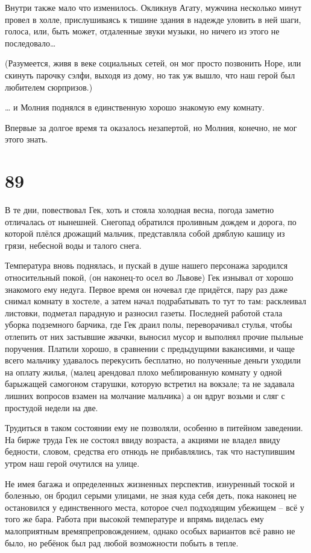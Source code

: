 \documentclass[
  a5paperpaper,
  DIV=11,
  numbers=noendperiod]{scrreprt}
\begin{document}
Внутри также мало что изменилось. Окликнув Агату, мужчина несколько
минут провел в холле, прислушиваясь к тишине здания в надежде уловить в
ней шаги, голоса, или, быть может, отдаленные звуки музыки, но ничего из
этого не последовало\ldots{}

(Разумеется, живя в веке социальных сетей, он мог просто позвонить Норе,
или скинуть парочку сэлфи, выходя из дому, но так уж вышло, что наш
герой был любителем сюрпризов.)

\ldots{} и Молния поднялся в единственную хорошо знакомую ему комнату.

Впервые за долгое время та оказалось незапертой, но Молния, конечно, не
мог этого знать.

\section*{89}\label{89}


В те дни, повествовал Гек, хоть и стояла холодная весна, погода заметно
отличалась от нынешней. Снегопад обратился проливным дождем и дорога, по
которой плёлся дрожащий мальчик, представляла собой дряблую кашицу из
грязи, небесной воды и талого снега.

Температура вновь поднялась, и пускай в душе нашего персонажа зародился
относительный покой, (он наконец-то осел во Львове) Гек изнывал от
хорошо знакомого ему недуга. Первое время он ночевал где придётся, пару
раз даже снимал комнату в хостеле, а затем начал подрабатывать то тут то
там: расклеивал листовки, подметал парадную и разносил газеты. Последней
работой стала уборка подземного барчика, где Гек драил полы,
переворачивал стулья, чтобы отлепить от них застывшие жвачки, выносил
мусор и выполнял прочие пыльные поручения. Платили хорошо, в сравнении с
предыдущими вакансиями, и чаще всего мальчику удавалось перекусить
бесплатно, но полученные деньги уходили на оплату жилья, (малец
арендовал плохо меблированную комнату у одной барыжащей самогоном
старушки, которую встретил на вокзале; та не задавала лишних вопросов
взамен на молчание мальчика) а он вдруг возьми и сляг с простудой недели
на две.

Трудиться в таком состоянии ему не позволяли, особенно в питейном
заведении. На бирже труда Гек не состоял ввиду возраста, а акциями не
владел ввиду бедности, словом, средства его отнюдь не прибавлялись, так
что наступившим утром наш герой очутился на улице.

Не имея багажа и определенных жизненных перспектив, изнуренный тоской и
болезнью, он бродил серыми улицами, не зная куда себя деть, пока наконец
не остановился у единственного места, которое счел подходящим убежищем
-- всё у того же бара. Работа при высокой температуре и впрямь виделась
ему малоприятным времяпрепровождением, однако особых вариантов всё равно
не было, но ребёнок был рад любой возможности побыть в тепле.
\end{document}
